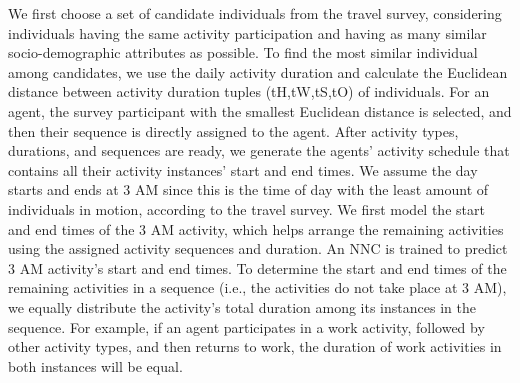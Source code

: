 \documentclass[../main.tex]{subfiles}
\begin{document}
We first choose a set of candidate individuals from the travel survey, considering individuals having the same activity participation and having as many similar socio-demographic attributes as possible. To find the most similar individual among candidates, we use the daily activity duration and calculate the Euclidean distance between activity duration tuples (tH,tW,tS,tO) of individuals. For an agent, the survey participant with the smallest Euclidean distance is selected, and then their sequence is directly assigned to the agent.
After activity types, durations, and sequences are ready, we generate the agents’ activity schedule that contains all their activity instances’ start and end times. We assume the day starts and ends at 3 AM since this is the time of day with the least amount of individuals in motion, according to the travel survey.
We first model the start and end times of the 3 AM activity, which helps arrange the remaining activities using the assigned activity sequences and duration. An NNC is trained to predict 3 AM activity's start and end times. To determine the start and end times of the remaining activities in a sequence (i.e., the activities do not take place at 3 AM), we equally distribute the activity's total duration among its instances in the sequence. For example, if an agent participates in a work activity, followed by other activity types, and then returns to work, the duration of work activities in both instances will be equal.
\end{document}

